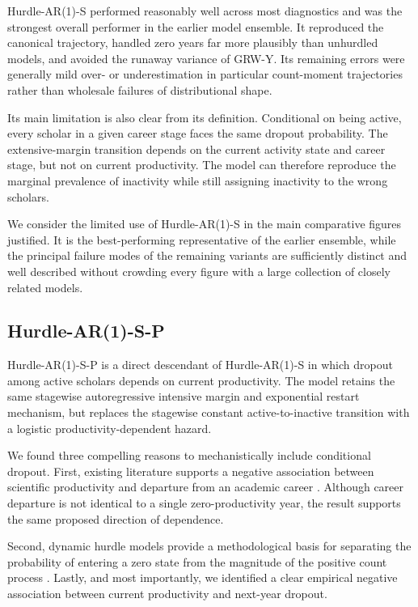 \documentclass[twocolumn, letterpaper]{article}
\begin{document}
Hurdle-AR(1)-S performed reasonably well across most diagnostics and was the strongest overall performer in the earlier model ensemble. It reproduced the canonical trajectory, handled zero years far more plausibly than unhurdled models, and avoided the runaway variance of GRW-Y. Its remaining errors were generally mild over- or underestimation in particular count-moment trajectories rather than wholesale failures of distributional shape.

Its main limitation is also clear from its definition. Conditional on being active, every scholar in a given career stage faces the same dropout probability. The extensive-margin transition depends on the current activity state and career stage, but not on current productivity. The model can therefore reproduce the marginal prevalence of inactivity while still assigning inactivity to the wrong scholars.

We consider the limited use of Hurdle-AR(1)-S in the main comparative figures justified. It is the best-performing representative of the earlier ensemble, while the principal failure modes of the remaining variants are sufficiently distinct and well described without crowding every figure with a large collection of closely related models.

\subsection{Hurdle-AR(1)-S-P}
\label{supp:hurdle_ar1_s_p}

Hurdle-AR(1)-S-P is a direct descendant of Hurdle-AR(1)-S in which dropout among active scholars depends on current productivity. The model retains the same stagewise autoregressive intensive margin and exponential restart mechanism, but replaces the stagewise constant active-to-inactive transition with a logistic productivity-dependent hazard.

We found three compelling reasons to mechanistically include conditional dropout. First, existing literature supports a negative association between scientific productivity and departure from an academic career \cite{geuna2015moving}. Although career departure is not identical to a single zero-productivity year, the result supports the same proposed direction of dependence. 

Second, dynamic hurdle models provide a methodological basis for separating the probability of entering a zero state from the magnitude of the positive count process \cite{baetschmann2017dynamic}. Lastly, and most importantly, we identified a clear empirical negative association between current productivity and next-year dropout.
\end{document}
